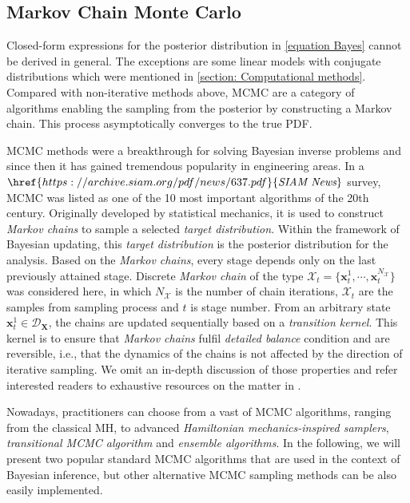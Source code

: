 \subsection{Markov Chain Monte Carlo}
Closed-form expressions for the posterior distribution in \cref{equation Bayes} cannot be derived in general. The exceptions are some linear models with conjugate distributions which were mentioned in \cref{section: Computational methods}. Compared with non-iterative methods above, \acrfull{MCMC} are a category of algorithms enabling the sampling from the posterior by constructing a Markov chain. This process asymptotically converges to the true \acrshort{PDF}.

\acrshort{MCMC} methods were a breakthrough for solving Bayesian inverse problems and since then it has gained tremendous popularity in engineering areas. In a $\href{https://archive.siam.org/pdf/news/637.pdf}{\textit{SIAM News}}$ survey, \acrshort{MCMC} was listed as one of the 10 most important algorithms of the 20th century. Originally developed by statistical mechanics, it is used to construct \textit{Markov chains} to sample a selected \textit{target distribution}. Within the framework of Bayesian updating, this \textit{target distribution} is the posterior distribution for the analysis. Based on the \textit{Markov chains}, every stage depends only on the last previously attained stage. Discrete \textit{Markov chain} of the type $\mathcal{X}_{t} =\{\boldsymbol{x}_{t}^{1},\cdots,\boldsymbol{x}_{t}^{N_{\mathcal{X}}}\}$ was considered here, in which $N_{\mathcal{X}}$ is the number of chain iterations, $\mathcal{X}_{t}$ are the samples from sampling process and $t$ is stage number. From an arbitrary state $\boldsymbol{x}_{t}^{1} \in \mathcal{D}_{\bm{X}}$, the chains are updated sequentially based on a \textit{transition kernel}. This kernel is to ensure that \textit{Markov chains} fulfil \textit{detailed balance} condition and are reversible, i.e., that the dynamics of the chains is not affected by the direction of iterative sampling. We omit an in-depth discussion of those properties and refer interested readers to exhaustive resources on the matter in \cite{murphy2012}.

Nowadays, practitioners can choose from a vast of \acrshort{MCMC} algorithms, ranging from the classical \acrfull{MH}, to advanced \textit{Hamiltonian mechanics-inspired samplers}, \textit{transitional MCMC algorithm} and \textit{ensemble algorithms}. In the following, we will present two popular standard \acrshort{MCMC} algorithms that are used in the context of Bayesian inference, but other alternative \acrshort{MCMC} sampling methods can be also easily implemented.
